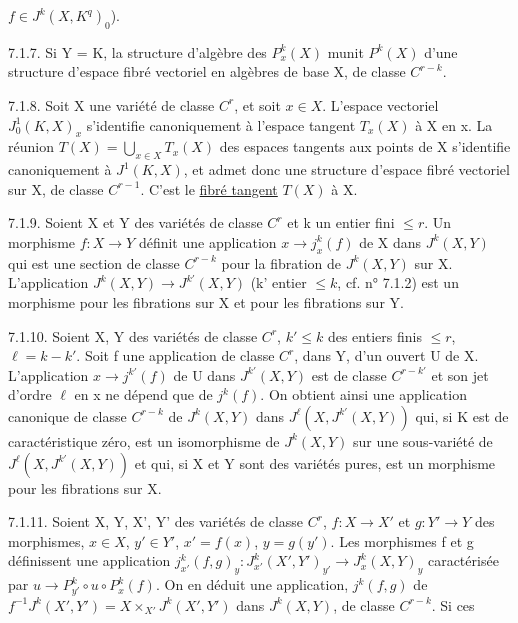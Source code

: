 
$f\in J^k(X,K^q)_0$).

7.1.7. Si Y = K, la structure d'algèbre des $P_x^k(X)$ munit $P^k(X)$ d'une structure d'espace fibré vectoriel en algèbres de base X, de classe $C^{r-k}$.

7.1.8. Soit X une variété de classe $C^r$, et soit $x\in X$. L'espace vectoriel $J_0^1(K,X)_x$ s'identifie canoniquement à l'espace tangent $T_x(X)$ à X en x. La réunion $T(X)=\bigcup_{x\in X}T_x(X)$ des espaces tangents aux points de X s'identifie canoniquement à $J^1(K,X)$, et admet donc une structure d'espace fibré vectoriel sur X, de classe $C^{r-1}$. C'est le \uline{fibré tangent} $T(X)$ à X.

7.1.9. Soient X et Y des variétés de classe $C^r$ et k un entier fini $\leq r$. Un morphisme $f:X\longrightarrow Y$ définit une application $x\longrightarrow j_x^k(f)$ de X dans $J^k(X,Y)$ qui est une section de classe $C^{r-k}$ pour la fibration de $J^k(X,Y)$ sur X. L'application $J^k(X,Y)\longrightarrow J^{k'}(X,Y)$ (k' entier $\leq k$, cf. n° 7.1.2) est un morphisme pour les fibrations sur X et pour les fibrations sur Y.

7.1.10. Soient X, Y des variétés de classe $C^r$, $k'\leq k$ des entiers finis $\leq r$, $\ell=k-k'$. Soit f une application de classe $C^r$, dans Y, d'un ouvert U de X. L'application $x\longrightarrow j^{k'}(f)$ de U dans $J^{k'}(X,Y)$ est de classe $C^{r-k'}$ et son jet d'ordre $\ell$ en x ne dépend que de $j^k(f)$. On obtient ainsi une application canonique de classe $C^{r-k}$ de $J^k(X,Y)$ dans $J^\ell(X,J^{k'}(X,Y))$ qui, si K est de caractéristique zéro, est un isomorphisme de $J^k(X,Y)$ sur une sous-variété de $J^\ell(X,J^{k'}(X,Y))$ et qui, si X et Y sont des variétés pures, est un morphisme pour les fibrations sur X.

7.1.11. Soient X, Y, X', Y' des variétés de classe $C^r$, $f:X\longrightarrow X'$ et $g:Y'\longrightarrow Y$ des morphismes, $x\in X$, $y'\in Y'$, $x'=f(x)$, $y=g(y')$. Les morphismes f et g définissent une application $j_{x'}^k(f,g)_y:J_{x'}^k(X',Y')_{y'}\longrightarrow J_x^k(X,Y)_y$ caractérisée par $u\longrightarrow P_{y'}^k\circ u\circ P_x^k(f)$. On en déduit une application, $j^k(f,g)$ de $f^{-1}J^k(X',Y')=X\times_{X'}J^k(X',Y')$ dans $J^k(X,Y)$, de classe $C^{r-k}$. Si ces
